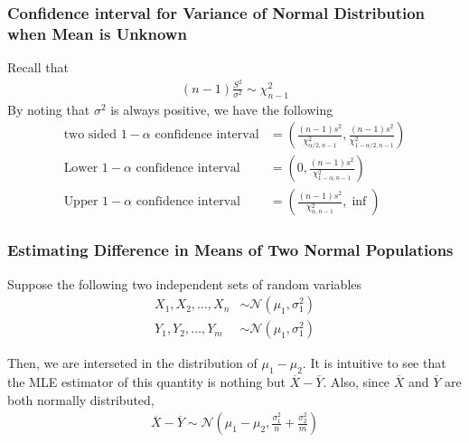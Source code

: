 \documentclass[../probability-notes.tex]{subfiles}
\begin{document}
    
    \subsubsection{Confidence interval for Variance of Normal Distribution when Mean is Unknown}
    Recall that
    \begin{align*}
        (n-1)\frac{S^{2}}{\sigma^{2}} \sim \chi_{n-1}^{2}
    \end{align*}
    By noting that $\sigma^{2}$ is always positive, we have the following
    \begin{align*}
        \text{two sided $1 - \alpha$ confidence interval} &= (\frac{(n-1)s^{2}}{\chi_{\alpha/2, n-1}^{2}}, \frac{(n-1)s^{2}}{\chi_{1 - \alpha/2, n-1}^{2}})\\
        \text{Lower $1-\alpha$ confidence interval} &= (0, \frac{(n-1)s^{2}}{\chi_{1 - \alpha, n-1}^{2}})\\
        \text{Upper $1-\alpha$ confidence interval} &= (\frac{(n-1)s^{2}}{\chi_{\alpha, n-1}^{2}}, \inf)        
    \end{align*}


    \subsubsection{Estimating Difference in Means of Two Normal Populations}
    Suppose the following two independent sets of random variables
    \begin{align*}
        X_{1}, X_{2}, \ldots, X_{n} &\sim \mathcal{N}(\mu_{1}, \sigma_{1}^{2})\\
        Y_{1}, Y_{2}, \ldots, Y_{m} &\sim \mathcal{N}(\mu_{1}, \sigma_{1}^{2})
    \end{align*}

    Then, we are interseted in the distribution of $\mu_{1} - \mu_{2}$. It is intuitive to see that the MLE estimator of this quantity is nothing but $\overline{X} - \overline{Y}$. Also, since $\overline{X}$ and $\overline{Y}$ are both normally distributed,
    \begin{align*}
        \overline{X} - \overline{Y} \sim \mathcal{N}(\mu_{1} - \mu_{2}, \frac{\sigma_{1}^{2}}{n} + \frac{\sigma_{2}^{2}}{m})
    \end{align*}
\end{document}
